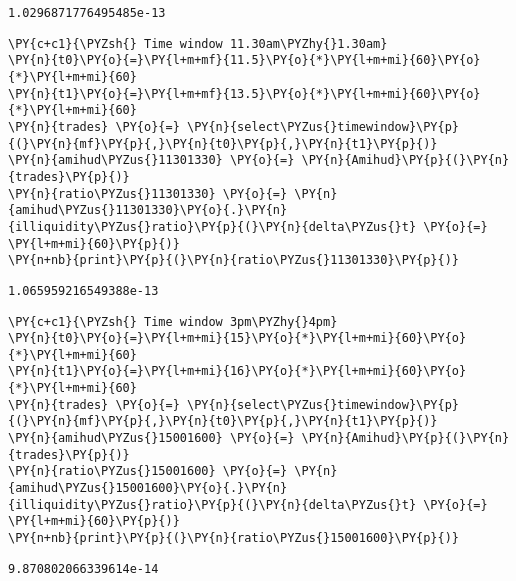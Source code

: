 \documentclass[11pt]{article}
\begin{document}
    \begin{Verbatim}[commandchars=\\\{\}]
1.0296871776495485e-13
    \end{Verbatim}

    \begin{tcolorbox}[breakable, size=fbox, boxrule=1pt, pad at break*=1mm,colback=cellbackground, colframe=cellborder]
\begin{Verbatim}[commandchars=\\\{\}]
\PY{c+c1}{\PYZsh{} Time window 11.30am\PYZhy{}1.30am}
\PY{n}{t0}\PY{o}{=}\PY{l+m+mf}{11.5}\PY{o}{*}\PY{l+m+mi}{60}\PY{o}{*}\PY{l+m+mi}{60}
\PY{n}{t1}\PY{o}{=}\PY{l+m+mf}{13.5}\PY{o}{*}\PY{l+m+mi}{60}\PY{o}{*}\PY{l+m+mi}{60}
\PY{n}{trades} \PY{o}{=} \PY{n}{select\PYZus{}timewindow}\PY{p}{(}\PY{n}{mf}\PY{p}{,}\PY{n}{t0}\PY{p}{,}\PY{n}{t1}\PY{p}{)}
\PY{n}{amihud\PYZus{}11301330} \PY{o}{=} \PY{n}{Amihud}\PY{p}{(}\PY{n}{trades}\PY{p}{)}
\PY{n}{ratio\PYZus{}11301330} \PY{o}{=} \PY{n}{amihud\PYZus{}11301330}\PY{o}{.}\PY{n}{illiquidity\PYZus{}ratio}\PY{p}{(}\PY{n}{delta\PYZus{}t} \PY{o}{=} \PY{l+m+mi}{60}\PY{p}{)}
\PY{n+nb}{print}\PY{p}{(}\PY{n}{ratio\PYZus{}11301330}\PY{p}{)}
\end{Verbatim}
\end{tcolorbox}

    \begin{Verbatim}[commandchars=\\\{\}]
1.065959216549388e-13
    \end{Verbatim}

    \begin{tcolorbox}[breakable, size=fbox, boxrule=1pt, pad at break*=1mm,colback=cellbackground, colframe=cellborder]
\begin{Verbatim}[commandchars=\\\{\}]
\PY{c+c1}{\PYZsh{} Time window 3pm\PYZhy{}4pm}
\PY{n}{t0}\PY{o}{=}\PY{l+m+mi}{15}\PY{o}{*}\PY{l+m+mi}{60}\PY{o}{*}\PY{l+m+mi}{60}
\PY{n}{t1}\PY{o}{=}\PY{l+m+mi}{16}\PY{o}{*}\PY{l+m+mi}{60}\PY{o}{*}\PY{l+m+mi}{60}
\PY{n}{trades} \PY{o}{=} \PY{n}{select\PYZus{}timewindow}\PY{p}{(}\PY{n}{mf}\PY{p}{,}\PY{n}{t0}\PY{p}{,}\PY{n}{t1}\PY{p}{)}
\PY{n}{amihud\PYZus{}15001600} \PY{o}{=} \PY{n}{Amihud}\PY{p}{(}\PY{n}{trades}\PY{p}{)}
\PY{n}{ratio\PYZus{}15001600} \PY{o}{=} \PY{n}{amihud\PYZus{}15001600}\PY{o}{.}\PY{n}{illiquidity\PYZus{}ratio}\PY{p}{(}\PY{n}{delta\PYZus{}t} \PY{o}{=} \PY{l+m+mi}{60}\PY{p}{)}
\PY{n+nb}{print}\PY{p}{(}\PY{n}{ratio\PYZus{}15001600}\PY{p}{)}
\end{Verbatim}
\end{tcolorbox}

    \begin{Verbatim}[commandchars=\\\{\}]
9.870802066339614e-14
    \end{Verbatim}


    
    
    
\end{document}
